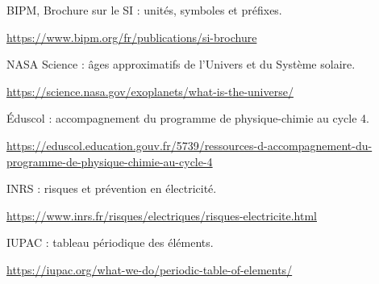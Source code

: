 \par\noindent\begin{minipage}{\linewidth}
BIPM, Brochure sur le SI : unités, symboles et préfixes.\par{\fontsize{8.5}{11}\selectfont\raggedright\url{https://www.bipm.org/fr/publications/si-brochure}\par}\end{minipage}\par
\par\noindent\begin{minipage}{\linewidth}
NASA Science : âges approximatifs de l’Univers et du Système solaire.\par{\fontsize{8.5}{11}\selectfont\raggedright\url{https://science.nasa.gov/exoplanets/what-is-the-universe/}\par}\end{minipage}\par
\par\noindent\begin{minipage}{\linewidth}
Éduscol : accompagnement du programme de physique-chimie au cycle 4.\par{\fontsize{8.5}{11}\selectfont\raggedright\url{https://eduscol.education.gouv.fr/5739/ressources-d-accompagnement-du-programme-de-physique-chimie-au-cycle-4}\par}\end{minipage}\par
{}
\par\noindent\begin{minipage}{\linewidth}
INRS : risques et prévention en électricité.\par{\fontsize{8.5}{11}\selectfont\raggedright\url{https://www.inrs.fr/risques/electriques/risques-electricite.html}\par}\end{minipage}\par
\par\noindent\begin{minipage}{\linewidth}
IUPAC : tableau périodique des éléments.\par{\fontsize{8.5}{11}\selectfont\raggedright\url{https://iupac.org/what-we-do/periodic-table-of-elements/}\par}\end{minipage}\par
